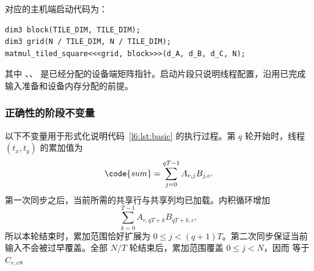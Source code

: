 \par\noindent\begin{minipage}{\linewidth}
对应的主机端启动代码为：

\begin{lstlisting}[numbers=none]
dim3 block(TILE_DIM, TILE_DIM);
dim3 grid(N / TILE_DIM, N / TILE_DIM);
matmul_tiled_square<<<grid, block>>>(d_A, d_B, d_C, N);
\end{lstlisting}
\end{minipage}\par
其中 、、 是已经分配的设备端矩阵指针。启动片段只说明线程配置，沿用已完成输入准备和设备内存分配的前提。

\subsubsection{正确性的阶段不变量}
以下不变量用于形式化说明代码~\ref{l6:lst:basic} 的执行过程。第 $q$ 轮开始时，线程 $(t_x,t_y)$ 的累加值为
\[
 \code{sum}=\sum_{j=0}^{qT-1}A_{r,j}B_{j,c}.
\]
第一次同步之后，当前所需的共享行与共享列均已加载。内积循环增加
\[
 \sum_{k=0}^{T-1}A_{r,qT+k}B_{qT+k,c},
\]
所以本轮结束时，累加范围恰好扩展为 $0\le j<(q+1)T$。第二次同步保证当前输入不会被过早覆盖。全部 $N/T$ 轮结束后，累加范围覆盖 $0\le j<N$，因而  等于 $C_{r,c}$。
\FloatBarrier
